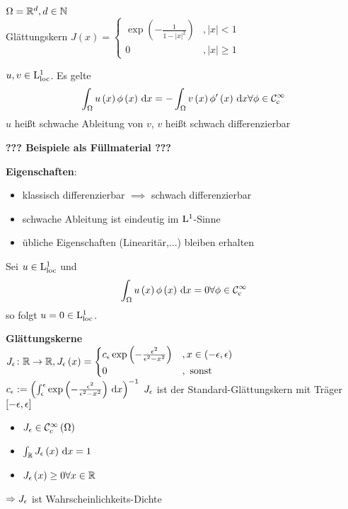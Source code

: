 \begin{expl}
	$\Omega=\mathbb{R}^{d},d\in\mathbb{N}$\\
	Glättungskern $J\left(x\right)=\begin{cases}
		\operatorname{exp}\left(-\frac{1}{1-|x|^{2}}\right) &, |x| < 1\\
		0 &, |x| \geq 1
	\end{cases}$
\end{expl}

\begin{definition}
	$u,v\in\mathrm{L}^{1}_{\text{loc}}$. Es gelte
	\begin{equation*}
		\int_{\Omega}u\left(x\right)\phi\left(x\right)\,\mathrm{d}x = -\int_{\Omega}v\left(x\right)\phi^{\prime}\left(x\right)\,\mathrm{d}x \forall\phi\in\mathcal{C}^{\infty}_{\text{c}}
	\end{equation*}
	$u$ heißt schwache Ableitung von $v$, $v$ heißt schwach differenzierbar
\end{definition}

\textbf{??? Beispiele als Füllmaterial ???}

\textbf{Eigenschaften}:
\begin{itemize}
	\item klassisch differenzierbar $\implies$ schwach differenzierbar
	\item schwache Ableitung ist eindeutig im $\mathrm{L}^{1}$-Sinne
	\item übliche Eigenschaften (Linearitär,...) bleiben erhalten
\end{itemize}

\begin{lemma}
	Sei $u\in\mathrm{L}^{1}_{\text{loc}}$ und
	\begin{equation*}
		\int_{\Omega}u\left(x\right)\phi\left(x\right)\,\mathrm{d}x = 0 \forall\phi\in\mathcal{C}^{\infty}_{\text{c}}
	\end{equation*}
	so folgt $u=0\in\mathrm{L}^{1}_{\text{loc}}$.
\end{lemma}

\begin{definition}
	\textbf{Glättungskerne}\\
	$J_{\epsilon}\colon\mathbb{R}\to\mathbb{R}, J_{\epsilon}\left(x\right)=\begin{cases}
		c_{\epsilon}\operatorname{exp}\left(-\frac{\epsilon^{2}}{\epsilon^{2}-x^{2}}\right) &, x\in\left(-\epsilon,\epsilon\right)\\
		0 &, \text{ sonst}
	\end{cases}$\\
	$c_{\epsilon}:=\left(\int_{\epsilon}^{\epsilon}\operatorname{exp}\left(-\frac{\epsilon^{2}}{\epsilon^{2}-x^{2}}\right)\,\mathrm{d}x\right)^{-1}$
	$J_{\epsilon}$ ist der Standard-Glättungskern mit Träger $\left[-\epsilon,\epsilon\right]${}
	\begin{itemize}
		\item $J_{\epsilon}\in\mathcal{C}^{\infty}_{c}\left(\Omega\right)$
		\item $\int_{\mathbb{R}}J_{\epsilon}\left(x\right)\,\mathrm{d}x = 1$
		\item $J_{\epsilon}\left(x\right)\geq 0 \forall x\in\mathbb{R}$		
	\end{itemize}
	$\Rightarrow J_{\epsilon}$ ist Wahrscheinlichkeits-Dichte
\end{definition}
